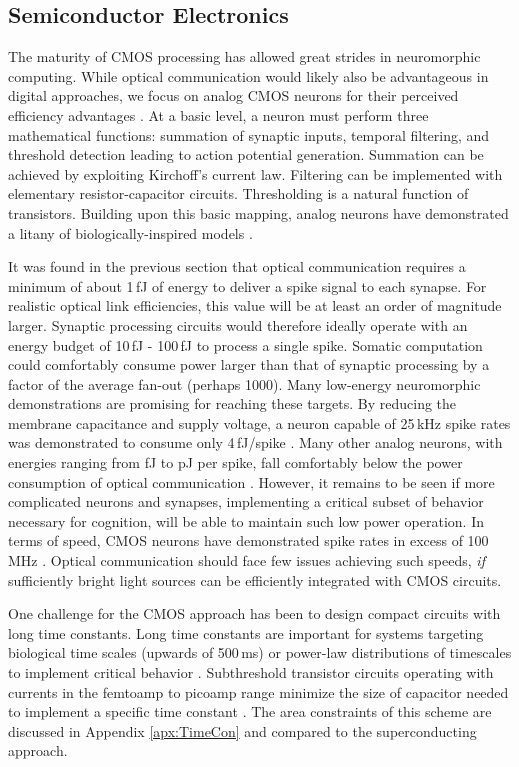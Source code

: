 \documentclass[twocolumn]{article}
\begin{document}
\subsection{Semiconductor Electronics}
The maturity of CMOS processing has allowed great strides in neuromorphic computing. While optical communication would likely also be advantageous in digital approaches, we focus on analog CMOS neurons for their perceived efficiency advantages \cite{mead1990neuromorphic,rajendran2012specifications}. At a basic level, a neuron must perform three mathematical functions: summation of synaptic inputs, temporal filtering, and threshold detection leading to action potential generation. Summation can be achieved by exploiting Kirchoff's current law. Filtering can be implemented with elementary resistor-capacitor circuits. Thresholding is a natural function of transistors. Building upon this basic mapping, analog neurons have demonstrated a litany of biologically-inspired models \cite{indiveri2011neuromorphic,lide2015}.

It was found in the previous section that optical communication requires a minimum of about 1\,fJ of energy to deliver a spike signal to each synapse. For realistic optical link efficiencies, this value will be at least an order of magnitude larger. Synaptic processing circuits would therefore ideally operate with an energy budget of 10\,fJ - 100\,fJ to process a single spike. Somatic computation could comfortably consume power larger than that of synaptic processing by a factor of the average fan-out (perhaps 1000). Many low-energy neuromorphic demonstrations are promising for reaching these targets. By reducing the membrane capacitance and supply voltage, a neuron capable of 25\,kHz spike rates was demonstrated to consume only 4\,fJ/spike \cite{sourikopoulos20174}. Many other analog neurons, with energies ranging from fJ to pJ per spike, fall comfortably below the power consumption of optical communication \cite{indiveri2019importance}. However, it remains to be seen if more complicated neurons and synapses, implementing a critical subset of behavior necessary for cognition, will be able to maintain such low power operation. In terms of speed, CMOS neurons have demonstrated spike rates in excess of 100\,MHz \cite{schemmel2017accelerated}.  Optical communication should face few issues achieving such speeds, \textit{if} sufficiently bright light sources can be efficiently integrated with CMOS circuits.

One challenge for the CMOS approach has been to design compact circuits with long time constants. Long time constants are important for systems targeting biological time scales (upwards of 500\,ms) \cite{indiveri2019importance} or power-law distributions of timescales to implement critical behavior \cite{be2007}. Subthreshold transistor circuits operating with currents in the femtoamp to picoamp range minimize the size of capacitor needed to implement a specific time constant \cite{indiveri2011neuromorphic}. The area constraints of this scheme are discussed in Appendix \ref{apx:TimeCon} and compared to the superconducting approach. 
\end{document}
